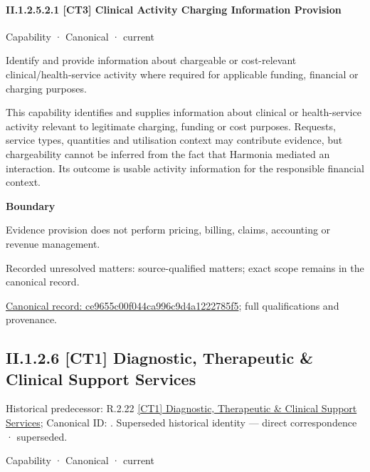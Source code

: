 \paragraph*{II.1.2.5.2.1 [CT3] Clinical Activity Charging Information Provision}
\label{navigation:II.1.2.5.2.1}

\label{element:ce9655c00f044ca996c9d4a1222785f5}
{\small Capability · Canonical · current}\par

Identify and provide information about chargeable or cost-relevant clinical/health-service activity where required for applicable funding, financial or charging purposes.



This capability identifies and supplies information about clinical or health-service activity relevant to legitimate charging, funding or cost purposes. Requests, service types, quantities and utilisation context may contribute evidence, but chargeability cannot be inferred from the fact that Harmonia mediated an interaction. Its outcome is usable activity information for the responsible financial context.



\textbf{Boundary}



Evidence provision does not perform pricing, billing, claims, accounting or revenue management.


{\small Recorded unresolved matters: source-qualified matters; exact scope remains in the canonical record.}\par
{\footnotesize \href{../../../../continuum/strategy/capability/ce9655c00f044ca996c9d4a1222785f5.md}{Canonical record: ce9655c00f044ca996c9d4a1222785f5}; full qualifications and provenance.}\par
\subsection*{II.1.2.6 [CT1] Diagnostic, Therapeutic \& Clinical Support Services}
\label{navigation:II.1.2.6}

{\small Historical predecessor: R.2.22 \hyperref[element:e003b9cd0730459a84775d2837d1d173]{[CT1] Diagnostic, Therapeutic \& Clinical Support Services}; Canonical ID: \texttt{}. Superseded historical identity — direct correspondence · superseded.}\par
\label{element:4d98c3503a9f4890a677f09b0c3b6f82}
{\small Capability · Canonical · current}\par

